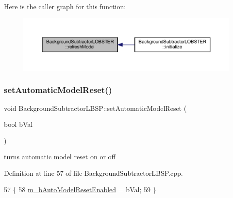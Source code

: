 Here is the caller graph for this function\+:\nopagebreak
\begin{figure}[H]
\begin{center}
\leavevmode
\includegraphics[width=350pt]{class_background_subtractor_l_o_b_s_t_e_r_aeb3b23c1f47cfe71a73f3ca47ec06a75_icgraph}
\end{center}
\end{figure}
\mbox{\label{class_background_subtractor_l_b_s_p_a31b8474f8b4ffa6ef08ec682cfcef9b0}} 
\subsubsection{\texorpdfstring{set\+Automatic\+Model\+Reset()}{setAutomaticModelReset()}}
{\footnotesize\ttfamily void Background\+Subtractor\+L\+B\+S\+P\+::set\+Automatic\+Model\+Reset (\begin{DoxyParamCaption}\item[{bool}]{b\+Val }\end{DoxyParamCaption})\hspace{0.3cm}{\ttfamily [inherited]}}



turns automatic model reset on or off 



Definition at line 57 of file Background\+Subtractor\+L\+B\+S\+P.\+cpp.


\begin{DoxyCode}
57                                                                \{
58     \mbox{\hyperlink{class_background_subtractor_l_b_s_p_a9d260f4e42e3fc79fb21af950ca9087a}{m\_bAutoModelResetEnabled}} = bVal;
59 \}
\end{DoxyCode}
\mbox{\label{class_background_subtractor_l_b_s_p_a34dc38d3d925d46d289c750786f232dc}} 
